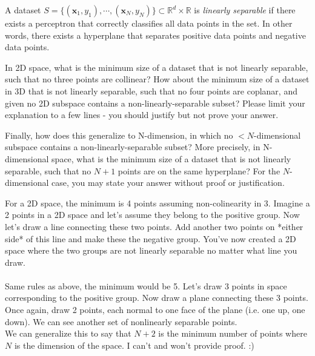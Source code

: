 \begin{problem}[4]
  A dataset $S = \{(\mathbf{x}_1, y_1),\cdots,(\mathbf{x}_N, y_N)\} \subset \mathbb{R}^d \times \mathbb{R}$ is \emph{linearly separable} if there exists a perceptron that correctly classifies all data points in the set. In other words, there exists a hyperplane that separates positive data points and negative data points.

  In 2D space, what is the minimum size of a dataset that is not linearly separable, such that no three points are collinear? How about the minimum size of a dataset in 3D that is not linearly separable, such that no four points are coplanar, and given no 2D subspace contains a non-linearly-separable subset? Please limit your explanation to a few lines - you should justify but not prove your answer.

  Finally, how does this generalize to N-dimension, in which no $<N$-dimensional subspace contains a non-linearly-separable subset? More precisely, in N-dimensional space, what is the minimum size of a dataset that is not linearly separable, such that no $N+1$ points are on the same hyperplane? For the $N$-dimensional case, you may state your answer without proof or justification.

\end{problem}
\begin{solution}
For a 2D space, the minimum is 4 points assuming non-colinearity in 3. Imagine a 2 points in a 2D space and let's assume they belong to the positive group. Now let's draw a line connecting these two points. Add another two points on *either side* of this line and make these the negative group. You've now created a 2D space where the two groups are not linearly separable no matter what line you draw.\\
\\
Same rules as above, the minimum would be 5. Let's draw 3 points in space corresponding to the positive group. Now draw a plane connecting these 3 points. Once again, draw 2 points, each normal to one face of the plane (i.e. one up, one down). We can see another set of nonlinearly separable points.
\\
We can generalize this to say that $N+2$ is the minimum number of points where $N$ is the dimension of the space. I can't and won't provide proof. :)
\end{solution}

